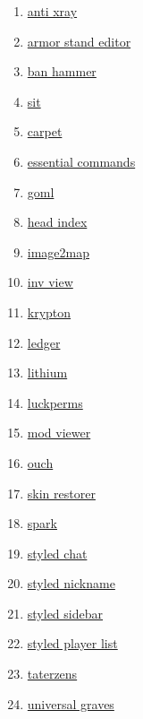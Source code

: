 \begin{enumerate}
    \item \href{https://github.com/DrexHD/AntiXray}{anti xray}
    \item \href{https://github.com/Patbox/ArmorStandEditor}{armor stand editor}
    \item \href{https://github.com/Patbox/BanHammer}{ban hammer}
    \item \href{https://github.com/bl4ckscor3/Sit}{sit}
    \item \href{https://github.com/gnembon/fabric-carpet}{carpet}
    \item \href{https://github.com/John-Paul-R/Essential-Commands}{essential commands}
    \item \href{https://github.com/Patbox/get-off-my-lawn-reserved}{goml}
    \item \href{https://github.com/PotatoPresident/HeadIndex}{head index}
    \item \href{https://github.com/Patbox/Image2Map}{image2map}
    \item \href{https://github.com/PotatoPresident/InvView}{inv view}
    \item \href{https://github.com/astei/krypton}{krypton}
    \item \href{https://github.com/QuiltServerTools/Ledger}{ledger}
    \item \href{https://github.com/caffeinemc/lithium-fabric}{lithium}
    \item \href{https://github.com/LuckPerms/LuckPerms}{luckperms}
    \item \href{https://github.com/haykam821/Mod-Viewer}{mod viewer}
    \item \href{https://github.com/patbox/ouch}{ouch}
    \item \href{https://github.com/Suiranoil/SkinRestorer}{skin restorer}
    \item \href{https://github.com/lucko/spark}{spark}
    \item \href{https://github.com/Patbox/StyledChat}{styled chat}
    \item \href{https://github.com/Patbox/StyledNicknames}{styled nickname}
    \item \href{https://github.com/Patbox/StyledSidebars}{styled sidebar}
    \item \href{https://github.com/Patbox/StyledPlayerList}{styled player list}
    \item \href{https://github.com/samolego/Taterzens/}{taterzens}
    \item \href{https://github.com/Patbox/UniversalGraves}{universal graves}

\end{enumerate}
